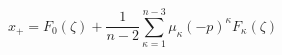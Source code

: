\begin{equation}
x_{+}=F_{0}(\zeta)+\frac{1}{n-2} \sum_{\kappa=1}^{n-3} \mu_{\kappa}
(-p)^{\kappa} F_{\kappa}(\zeta)\label{m1}
\end{equation}

